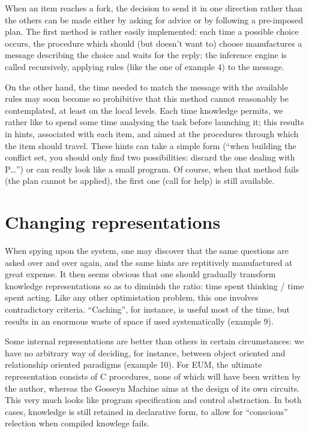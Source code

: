 \documentclass[11pt,a4paper,svgnames]{article}
\begin{document}
  When an item reaches a fork, the decision to send it in one direction rather
  than the others can be made either by asking for advice or by following a
  pre-imposed plan. The first method is rather easily implemented: each time a
  possible choice occurs, the procedure which should (but doesn't want to) choose
  manufactures a message describing the choice and waits for the reply; the
  inference engine is called recursively, applying rules (like the one of example
  4) to the message.

  On the other hand, the time needed to match the message with the available
  rules may soon become so prohibitive that this method cannot reasonably be
  contemplated, at least on the local levels. Each time knowledge permits, we
  rather like to spend some time analysing the task before launching it; this
  results in hints, associated with each item, and aimed at the procedures
  through which the item should travel. These hints can take a simple form
  (``when building the conflict set, you should only find two possibilities:
  discard the one dealing with P\ldots'') or can really look like a small program.
  Of course, when that method fails (the plan cannot be applied), the first one
  (call for help) is still available.

  \section{Changing representations}
  \label{sec:changing-repr}

  When spying upon the system, one may discover that the same questions are
  asked over and over again, and the same hints are reptitively manufactured at
  great expense. It then seems obvious that one should gradually transform
  knowledge representations so as to diminish the ratio: time spent thinking /
  time spent acting. Like any other optimistation problem, this one involves
  contradictory criteria. ``Caching'', for instance, is useful most of the time,
  but results in an enormous waste of space if used systematically (example 9).

  Some internal representations are better than others in certain circumstances:
  we have no arbitrary way of deciding, for instance, between object oriented and
  relationship oriented paradigms (example 10). For EUM, the ultimate
  representation consists of C procedures, none of which will have been written
  by the author, whereas the Gosseyn Machine aims at the design of its own circuits.
  This very much looks like program specification and control abstraction. In both
  cases, knowledge is still retained in declarative form, to allow for
  ``conscious'' relection when compiled knowlege fails.
\end{document}
